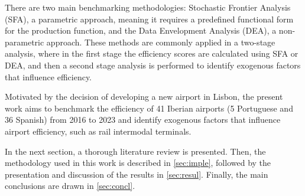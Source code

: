  There are two main benchmarking methodologies: Stochastic Frontier Analysis (SFA), a parametric approach, meaning it requires a predefined functional form
for the production function, and the Data Envelopment Analysis (DEA), a non-parametric approach. These methods are commonly applied in a two-stage analysis, where in the first stage the efficiency scores are calculated using SFA or DEA, and then a second stage analysis is performed to identify exogenous factors that influence efficiency.

Motivated by the decision of developing a new airport in Lisbon, the present work aims to benchmark the efficiency of 41 Iberian airports (5 Portuguese and 36 Spanish) from 2016 to
2023 and identify exogenous factors that influence airport efficiency, such as rail intermodal terminals.

In the next section, a thorough literature review is presented. Then, the methodology used in this work is described in \autoref{sec:imple}, followed by the presentation and discussion of the results in \autoref{sec:resul}. Finally, the main conclusions are drawn in \autoref{sec:concl}.